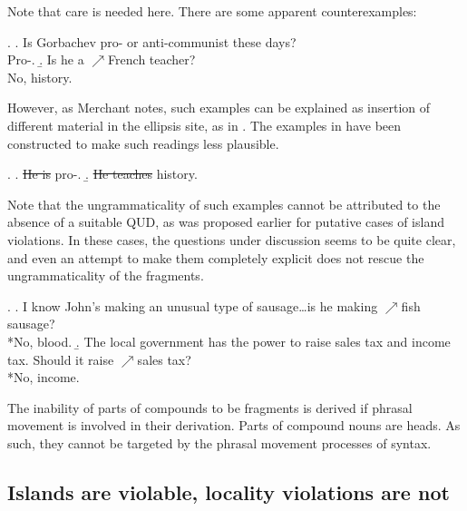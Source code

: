 \documentclass[11pt,letterpaper]{article}
\newcommand{\el}[1]{\sout{#1}}
\begin{document}
 	Note that care is needed here. There are some apparent counterexamples:
 	
 	\ex.		\a. Is Gorbachev pro- or anti-communist these days?\\
 		Pro-. %
 			\b. Is he a $\nearrow$French teacher?\\
 			No, history.
 			
 		However, as Merchant %
 		notes, such examples can be explained as insertion of different material in the ellipsis site, as in \Next.
 		The examples in \LLast have been constructed to make such readings less plausible.
 
 \ex.	\a. \el{He is} pro-.
 		\b. \el{He teaches} history.
 		
 		Note that the ungrammaticality of such examples cannot be attributed to the absence of a suitable QUD, as was proposed earlier for putative cases of island violations.
 		 In these cases, the questions under discussion seems to be quite clear, and even an attempt to make them completely explicit does not rescue the ungrammaticality of the fragments.
 		
 		\ex.		\a. I know John's making an unusual type of sausage\ldots is he making  $\nearrow$fish sausage?\\
 			{}*No, blood.
 				\b. The local government has the power to raise sales tax and income tax. Should it raise $\nearrow$sales tax?\\
 				{}*No, income.
 				
 The inability of parts of compounds to be fragments is derived if phrasal movement is involved in their derivation. 
 Parts of compound nouns are heads.
 As such, they cannot be targeted by the phrasal movement processes of syntax.
 
 \subsection{Islands are violable, locality violations are not}
 
\end{document}
